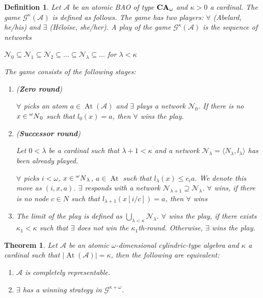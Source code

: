 \documentclass[a4paper]{article}
\theoremstyle{defin}
\newtheorem{defin}{Definition}
\theoremstyle{theorem}
\newtheorem{theorem}{Theorem}
\theoremstyle{prop}
\theoremstyle{lemma}
\theoremstyle{fact}
\theoremstyle{ex}
\theoremstyle{col}
\begin{document}
\begin{defin}
  Let $\mathcal{A}$ be an atomic BAO of type ${\bf CA}_{\omega}$ and $\kappa > 0$ a cardinal. The game $\mathcal{G}^{\kappa}(\mathcal{A})$ is defined as follows. The game has two players: $\forall$ (Abelard, he/his) and $\exists$ (H\'{e}lo\"{i}se, she/her). A play of the game $\mathcal{G}^{\kappa}(\mathcal{A})$ is the sequence of networks
  \begin{center}
    $\mathcal{N}_0 \subseteq \mathcal{N}_1 \subseteq \mathcal{N}_2 \subseteq \dots \subseteq \mathcal{N}_{\lambda} \subseteq \dots$ for $\lambda < \kappa$
  \end{center}
  The game consists of the following stages:
  \begin{enumerate}
    \item ({\bf Zero round})

    $\forall$ picks an atom $a \in \operatorname{At}(\mathcal{A})$ and $\exists$ plays a network $\mathcal{N}_0$. If there is no $x \in \prescript{\omega}{}N_0$ such that $l_0(x) = a$, then $\forall$ wins the play.
    \item ({\bf Successor round})

    Let $0 < \lambda$ be a cardinal such that $\lambda + 1 < \kappa$ and a network $\mathcal{N}_{\lambda} = \langle N_{\lambda}, l_{\lambda} \rangle$ has been already played.

    $\forall$ picks $i < \omega$, $x \in \prescript{\omega}{}N_{\lambda}$, $a \in \operatorname{At}$ such that $l_{\lambda}(x) \leq c_i a$.
    We denote this move as $(i, x, a)$. $\exists$ responds with a network $\mathcal{N}_{\lambda + 1} \supseteq \mathcal{N}_{\lambda}$. $\forall$ wins, if there is no node $c \in N$ such that $l_{\lambda+1}(x[i/c]) = a$, then $\forall$ wins
    \item The limit of the play is defined as $\bigcup \limits_{\lambda < \kappa} \mathcal{N}_{\lambda}$. $\forall$ wins the play, if there exists $\kappa_1 < \kappa$ such that $\exists$ does not win the $\kappa_1$th-round. Otherwise, $\exists$ wins the play.
  \end{enumerate}
\end{defin}

\begin{theorem}
  Let $\mathcal{A}$ be an atomic $\omega$-dimensional cylindric-type algebra and $\kappa$ a cardinal such that $|\operatorname{At}(\mathcal{A})| = \kappa$, then the following are equivalent:

  \begin{enumerate}
    \item $\mathcal{A}$ is completely representable.
    \item $\exists$ has a winning strategy in $\mathcal{G}^{\kappa + \omega}$.
  \end{enumerate}
\end{theorem}
\end{document}
